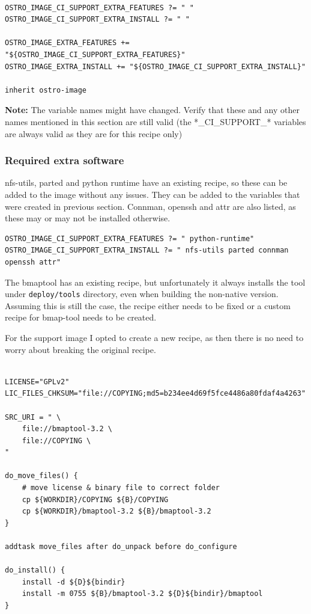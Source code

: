 \documentclass[a4paper,11pt]{article}
\newcommand{\note}{\textbf{Note: }}
\newcommand{\cmd}[1]{\texttt{#1}}
\begin{document}
\begin{lstlisting}

OSTRO_IMAGE_CI_SUPPORT_EXTRA_FEATURES ?= " "
OSTRO_IMAGE_CI_SUPPORT_EXTRA_INSTALL ?= " "

OSTRO_IMAGE_EXTRA_FEATURES += "${OSTRO_IMAGE_CI_SUPPORT_EXTRA_FEATURES}"
OSTRO_IMAGE_EXTRA_INSTALL += "${OSTRO_IMAGE_CI_SUPPORT_EXTRA_INSTALL}"

inherit ostro-image

\end{lstlisting}

\note The variable names might have changed. Verify that these and any other names mentioned in this section are still valid (the *\_CI\_SUPPORT\_* variables are always valid as they are for this recipe only)

\subsubsection*{Required extra software}

nfs-utils, parted and python runtime have an existing recipe, so these can be added to the image without any issues. They can be added to the variables that were created in previous section. Connman, openssh and attr are also listed, as these may or may not be installed otherwise.

\begin{lstlisting}
OSTRO_IMAGE_CI_SUPPORT_EXTRA_FEATURES ?= " python-runtime"
OSTRO_IMAGE_CI_SUPPORT_EXTRA_INSTALL ?= " nfs-utils parted connman openssh attr"
\end{lstlisting}

The bmaptool has an existing recipe, but unfortunately it always installs the tool under \cmd{deploy/tools} directory, even when building the non-native version. Assuming this is still the case, the recipe either needs to be fixed or a custom recipe for bmap-tool needs to be created. 

For the support image I opted to create a new recipe, as then there is no need to worry about breaking the original recipe. 

\begin{lstlisting}

LICENSE="GPLv2"
LIC_FILES_CHKSUM="file://COPYING;md5=b234ee4d69f5fce4486a80fdaf4a4263"

SRC_URI = " \
    file://bmaptool-3.2 \
    file://COPYING \
"

do_move_files() {
    # move license & binary file to correct folder
    cp ${WORKDIR}/COPYING ${B}/COPYING
    cp ${WORKDIR}/bmaptool-3.2 ${B}/bmaptool-3.2
}

addtask move_files after do_unpack before do_configure

do_install() {
    install -d ${D}${bindir}
    install -m 0755 ${B}/bmaptool-3.2 ${D}${bindir}/bmaptool
}

\end{lstlisting}
\end{document}

